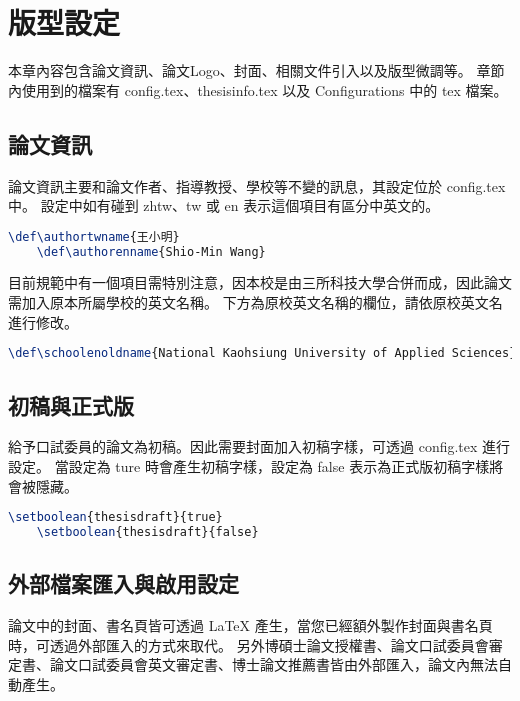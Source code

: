 \chapter{版型設定} \label{ch_tmp_config}

本章內容包含論文資訊、論文Logo、封面、相關文件引入以及版型微調等。
章節內使用到的檔案有 config.tex、thesisinfo.tex 以及 Configurations 中的 tex 檔案。

\section{論文資訊}

論文資訊主要和論文作者、指導教授、學校等不變的訊息，其設定位於 config.tex 中。
設定中如有碰到 zhtw、tw 或 en 表示這個項目有區分中英文的。

\begin{lstlisting}[language=TeX]
    \def\authortwname{王小明}
    \def\authorenname{Shio-Min Wang}
\end{lstlisting}

目前規範中有一個項目需特別注意，因本校是由三所科技大學合併而成，因此論文需加入原本所屬學校的英文名稱。
下方為原校英文名稱的欄位，請依原校英文名進行修改。

\begin{lstlisting}[language=TeX]
    \def\schoolenoldname{National Kaohsiung University of Applied Sciences}
\end{lstlisting}

\section{初稿與正式版}

給予口試委員的論文為初稿。因此需要封面加入初稿字樣，可透過 config.tex 進行設定。
當設定為 ture 時會產生初稿字樣，設定為 false 表示為正式版初稿字樣將會被隱藏。

\begin{lstlisting}[language=TeX]
    \setboolean{thesisdraft}{true}
    \setboolean{thesisdraft}{false}
\end{lstlisting}

\section{外部檔案匯入與啟用設定}

論文中的封面、書名頁皆可透過 LaTeX 產生，當您已經額外製作封面與書名頁時，可透過外部匯入的方式來取代。
另外博碩士論文授權書、論文口試委員會審定書、論文口試委員會英文審定書、博士論文推薦書皆由外部匯入，論文內無法自動產生。

